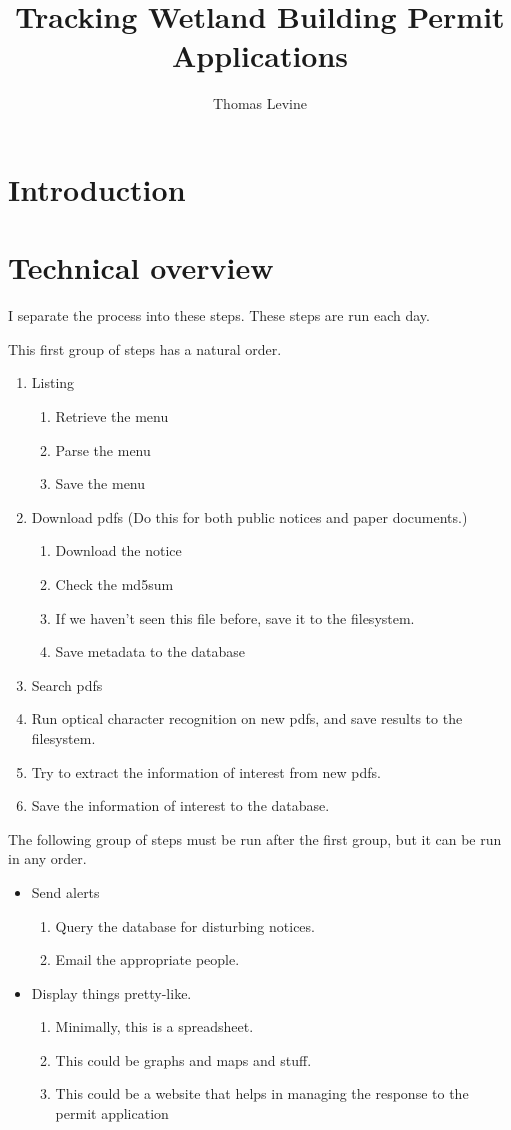 \documentclass{article}
\title{Tracking Wetland Building Permit Applications}
\author{Thomas Levine}
\begin{document}
\maketitle

\section{Introduction}

\section{Technical overview}
I separate the process into these steps. These steps are run each day.

This first group of steps has a natural order.
\begin{enumerate}
\item Listing
  \begin{enumerate}
  \item Retrieve the menu
  \item Parse the menu
  \item Save the menu
  \end{enumerate}
\item Download pdfs (Do this for both public notices and paper documents.)
  \begin{enumerate}
  \item Download the notice
  \item Check the md5sum
  \item If we haven't seen this file before, save it to the filesystem.
  \item Save metadata to the database
  \end{enumerate}
\item Search pdfs
  \item Run optical character recognition on new pdfs, and save results to the filesystem.
  \item Try to extract the information of interest from new pdfs.
  \item Save the information of interest to the database.
\end{enumerate}

The following group of steps must be run after the first group, but it can be
run in any order.
\begin{itemize}
\item Send alerts
  \begin{enumerate}
  \item Query the database for disturbing notices.
  \item Email the appropriate people.
  \end{enumerate}
\item Display things pretty-like.
  \begin{enumerate}
  \item Minimally, this is a spreadsheet.
  \item This could be graphs and maps and stuff.
  \item This could be a website that helps in managing the response to the
  permit application
  \end{enumerate}
\end{itemize}
\end{document}

